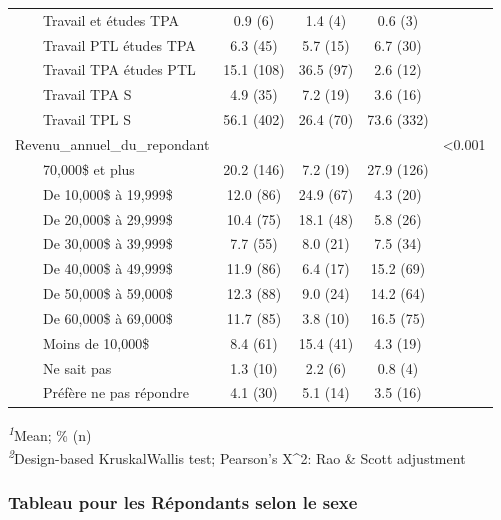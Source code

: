 \documentclass[
]{article}
\begin{document}
\begin{table}[!t]
\begin{tabular*}{\linewidth}{@{\extracolsep{\fill}}lcccc}
    Travail et études TPA & 0.9   (6) & 1.4   (4) & 0.6   (3) &  \\ 
    Travail PTL études TPA & 6.3   (45) & 5.7   (15) & 6.7   (30) &  \\ 
    Travail TPA études PTL & 15.1   (108) & 36.5   (97) & 2.6   (12) &  \\ 
    Travail TPA S & 4.9   (35) & 7.2   (19) & 3.6   (16) &  \\ 
    Travail TPL S & 56.1   (402) & 26.4   (70) & 73.6   (332) &  \\ 
Revenu\_annuel\_du\_repondant &  &  &  & <0.001 \\ 
    70,000\$ et plus & 20.2   (146) & 7.2   (19) & 27.9   (126) &  \\ 
    De 10,000\$ à 19,999\$ & 12.0   (86) & 24.9   (67) & 4.3   (20) &  \\ 
    De 20,000\$ à 29,999\$ & 10.4   (75) & 18.1   (48) & 5.8   (26) &  \\ 
    De 30,000\$ à 39,999\$ & 7.7   (55) & 8.0   (21) & 7.5   (34) &  \\ 
    De 40,000\$ à 49,999\$ & 11.9   (86) & 6.4   (17) & 15.2   (69) &  \\ 
    De 50,000\$ à 59,000\$ & 12.3   (88) & 9.0   (24) & 14.2   (64) &  \\ 
    De 60,000\$ à 69,000\$ & 11.7   (85) & 3.8   (10) & 16.5   (75) &  \\ 
    Moins de 10,000\$ & 8.4   (61) & 15.4   (41) & 4.3   (19) &  \\ 
    Ne sait pas & 1.3   (10) & 2.2   (6) & 0.8   (4) &  \\ 
    Préfère ne pas répondre & 4.1   (30) & 5.1   (14) & 3.5   (16) &  \\ 
\bottomrule
\end{tabular*}
\begin{minipage}{\linewidth}
\textsuperscript{\textit{1}}Mean; \%   (n)\\
\textsuperscript{\textit{2}}Design-based KruskalWallis test; Pearson's X\^{}2: Rao \& Scott adjustment\\
\end{minipage}
\end{table}
\vspace{1cm}

\hypertarget{tableau-pour-les-ruxe9pondants-selon-le-sexe}{%
\subsubsection{Tableau pour les Répondants selon le
sexe}\label{tableau-pour-les-ruxe9pondants-selon-le-sexe}}
\end{document}
